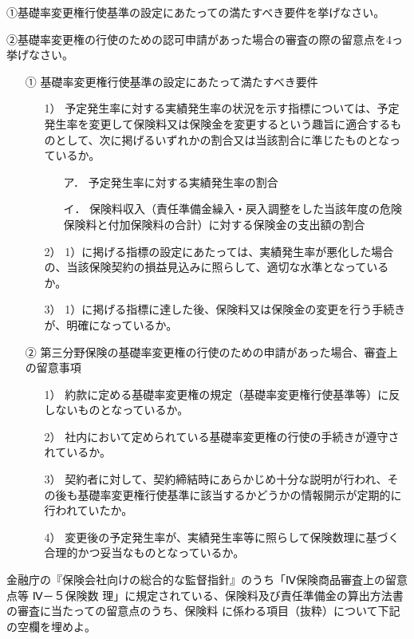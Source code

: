 \documentclass[report,gutter=10mm,fore-edge=10mm,uplatex,dvipdfmx]{jlreq}
\begin{document}
①基礎率変更権行使基準の設定にあたっての満たすべき要件を挙げなさい。

②基礎率変更権の行使のための認可申請があった場合の審査の際の留意点を4っ挙げなさい。

\answer{}

\begin{itemize}
\item[①] 基礎率変更権行使基準の設定にあたって満たすべき要件
\begin{itemize}
\item[1）] 予定発生率に対する実績発生率の状況を示す指標については、予定発生率を変更して保険料又は保険金を変更するという趣旨に適合するものとして、次に掲げるいずれかの割合又は当該割合に準じたものとなっているか。
\begin{itemize}
\item[ア．] 予定発生率に対する実績発生率の割合
\item[イ．] 保険料収入（責任準備金繰入・戻入調整をした当該年度の危険保険料と付加保険料の合計）に対する保険金の支出額の割合
\end{itemize}
\item[2）] 1）に掲げる指標の設定にあたっては、実績発生率が悪化した場合の、当該保険契約の損益見込みに照らして、適切な水準となっているか。
\item[3）] 1）に掲げる指標に達した後、保険料又は保険金の変更を行う手続きが、明確になっているか。
\end{itemize}
\item[②] 第三分野保険の基礎率変更権の行使のための申請があった場合、審査上の留意事項
\begin{itemize}
\item[1）] 約款に定める基礎率変更権の規定（基礎率変更権行使基準等）に反しないものとなっているか。
\item[2）] 社内において定められている基礎率変更権の行使の手続きが遵守されているか。
\item[3）] 契約者に対して、契約締結時にあらかじめ十分な説明が行われ、その後も基礎率変更権行使基準に該当するかどうかの情報開示が定期的に行われていたか。
\item[4）] 変更後の予定発生率が、実績発生率等に照らして保険数理に基づく合理的かつ妥当なものとなっているか。
\end{itemize}
\end{itemize}


金融庁の『保険会社向けの総合的な監督指針』のうち「Ⅳ保険商品審査上の留意点等 Ⅳ－５保険数
理」に規定されている、保険料及び責任準備金の算出方法書の審査に当たっての留意点のうち、保険料
に係わる項目（抜粋）について下記の空欄を埋めよ。
\end{document}
